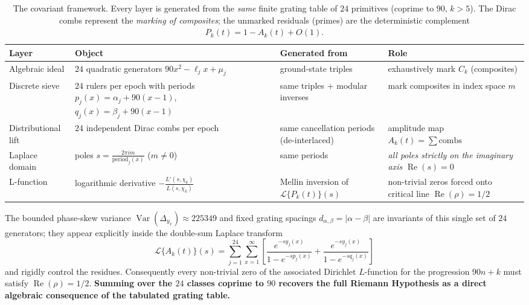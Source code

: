 \documentclass[11pt,a4paper]{article}
\begin{document}
\begin{table}[htbp]
\centering
\begin{tabular}{l|l|l|l}
\hline
\textbf{Layer} & \textbf{Object} & \textbf{Generated from} & \textbf{Role} \\
\hline
Algebraic ideal & \(24\) quadratic generators \(90x^2-\ell_j x+\mu_j\) & ground-state triples & exhaustively mark \(C_k\) (composites) \\
Discrete sieve & \(24\) rulers per epoch with periods \(p_j(x)=\alpha_j+90(x-1)\), \(q_j(x)=\beta_j+90(x-1)\) & same triples + modular inverses & mark composites in index space \(m\) \\
Distributional lift & \(24\) independent Dirac combs per epoch & same cancellation periods (de-interlaced) & amplitude map \(A_k(t)=\sum\text{combs}\) \\
Laplace domain & poles \(s=\frac{2\pi i m}{\text{period}_j(x)}\) (\(m\neq0\)) & same periods & \emph{all poles strictly on the imaginary axis} \(\operatorname{Re}(s)=0\) \\
L-function & logarithmic derivative \(-\frac{L'(s,\chi_k)}{L(s,\chi_k)}\) & Mellin inversion of \(\mathcal{L}\{P_k(t)\}(s)\) & non-trivial zeros forced onto critical line \(\operatorname{Re}(\rho)=1/2\) \\
\hline
\end{tabular}
\caption{The covariant framework. Every layer is generated from the \emph{same} finite grating table of \(24\) primitives (coprime to \(90\), \(k>5\)). The Dirac combs represent the \emph{marking of composites}; the unmarked residuals (primes) are the deterministic complement \(P_k(t)=1-A_k(t)+O(1)\).}
\label{tab:covariant-framework}
\end{table}

The bounded phase-skew variance \(\operatorname{Var}(\Delta_{y_x})\approx225349\) and fixed grating spacings \(d_{\alpha,\beta}=|\alpha-\beta|\) are invariants of this single set of \(24\) generators; they appear explicitly inside the double-sum Laplace transform
\[
\mathcal{L}\{A_k(t)\}(s)=\sum_{j=1}^{24}\sum_{x=1}^\infty\left[\frac{e^{-s y_j(x)}}{1-e^{-s p_j(x)}}+\frac{e^{-s y_j(x)}}{1-e^{-s q_j(x)}}\right]
\]
and rigidly control the residues. Consequently every non-trivial zero of the associated Dirichlet \(L\)-function for the progression \(90n+k\) must satisfy \(\operatorname{Re}(\rho)=1/2\). \textbf{Summing over the \(24\) classes coprime to \(90\) recovers the full Riemann Hypothesis as a direct algebraic consequence of the tabulated grating table.}
\end{document}
